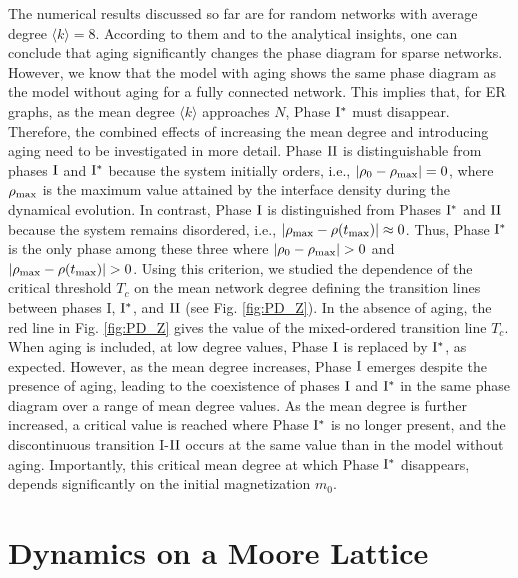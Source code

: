 The numerical results discussed so far are for random networks with average degree $\langle k \rangle = 8$. According to them and to the analytical insights, one can conclude that aging significantly changes the phase diagram for sparse networks. However, we know that the model with aging shows the same phase diagram as the model without aging for a fully connected network. This implies that, for ER graphs, as the mean degree $\langle k \rangle$ approaches $N$, Phase ${\rm I}^{*}$ must disappear. Therefore, the combined effects of increasing the mean degree and introducing aging need to be investigated in more detail. Phase ${\rm II}$ is distinguishable from phases ${\rm I}$ and ${\rm I}^{*}$ because the system initially orders, i.e., $|\rho_0 - \rho_{\rm max}| = 0$, where $\rho_{\rm max}$ is the maximum value attained by the interface density during the dynamical evolution. In contrast, Phase ${\rm I}$ is distinguished from Phases ${\rm I}^{*}$ and ${\rm II}$ because the system remains disordered, i.e., $|\rho_{\rm max} - \rho(t_{\rm max})| \approx 0$. Thus, Phase ${\rm I}^{*}$ is the only phase among these three where $|\rho_0 - \rho_{\rm max}| > 0$ and $|\rho_{\rm max} - \rho(t_{\rm max})| > 0$. Using this criterion, we studied the dependence of the critical threshold  $T_c$ on the mean network degree defining the transition lines between phases I, ${\rm I}^{*}$, and ${\rm II}$ (see Fig. \ref{fig:PD_Z}). In the absence of aging, the red line in Fig. \ref{fig:PD_Z} gives the value of the mixed-ordered transition line $T_c$. When aging is included, at low degree values, Phase ${\rm I}$ is replaced by ${\rm I}^{*}$, as expected. However, as the mean degree increases, Phase ${\rm I}$ emerges despite the presence of aging, leading to the coexistence of phases ${\rm I}$ and ${\rm I}^{*}$ in the same phase diagram over a range of mean degree values. As the mean degree is further increased, a critical value is reached where Phase ${\rm I}^{*}$ is no longer present, and the discontinuous transition I-${\rm II}$ occurs at the same value than in the model without aging. Importantly, this critical mean degree at which Phase ${\rm I}^{*}$ disappears, depends significantly on the initial magnetization $m_0$.

\section{\label{sec: Dynamics on a Moore Lattice}  Dynamics on a Moore Lattice}

